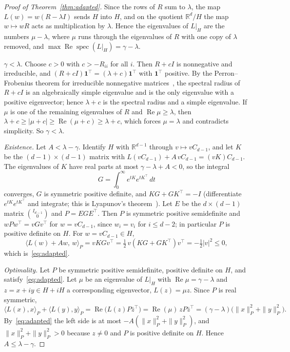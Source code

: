 \documentclass[11pt]{amsart}
\theoremstyle{definition}
\theoremstyle{remark}
\newcommand{\R}{\mathbb R}
\newcommand{\one}{\mathbf 1}
\DeclareMathOperator{\Real}{Re}
\begin{document}
\begin{proof}[Proof of Theorem~\ref{thm:adapted}]
Since the rows of $R$ sum to $\lambda$, the map $L(w)=w(R-\lambda I)$ sends $H$ into $H$, and on the quotient $\R^d/H$ the map $w\mapsto wR$ acts as multiplication by $\lambda$. Hence the eigenvalues of $L|_H$ are the numbers $\mu-\lambda$, where $\mu$ runs through the eigenvalues of $R$ with one copy of $\lambda$ removed, and $\max\Real\operatorname{spec}(L|_H)=\gamma-\lambda$.

\emph{$\gamma<\lambda$.} Choose $c>0$ with $c>-R_{ii}$ for all $i$. Then $R+cI$ is nonnegative and irreducible, and $(R+cI)\one^{\top}=(\lambda+c)\one^{\top}$ with $\one^{\top}$ positive. By the Perron--Frobenius theorem for irreducible nonnegative matrices~\cite[Section~8.4]{HJ}, the spectral radius of $R+cI$ is an algebraically simple eigenvalue and is the only eigenvalue with a positive eigenvector; hence $\lambda+c$ is the spectral radius and a simple eigenvalue. If $\mu$ is one of the remaining eigenvalues of $R$ and $\Real\mu\ge\lambda$, then $\lambda+c\ge|\mu+c|\ge\Real(\mu+c)\ge\lambda+c$, which forces $\mu=\lambda$ and contradicts simplicity. So $\gamma<\lambda$.

\emph{Existence.} Let $A<\lambda-\gamma$. Identify $H$ with $\R^{d-1}$ through $v\mapsto vC_{d-1}$, and let $K$ be the $(d-1)\times(d-1)$ matrix with $L(vC_{d-1})+A\,vC_{d-1}=(vK)C_{d-1}$. The eigenvalues of $K$ have real parts at most $\gamma-\lambda+A<0$, so the integral
\[
G=\int_0^\infty e^{tK}e^{tK^{\top}}\,dt
\]
converges, $G$ is symmetric positive definite, and $KG+GK^{\top}=-I$ (differentiate $e^{tK}e^{tK^{\top}}$ and integrate; this is Lyapunov's theorem~\cite[Section~2.2]{HJTopics}). Let $E$ be the $d\times(d-1)$ matrix $\binom{I_{d-1}}{0}$ and $P=EGE^{\top}$. Then $P$ is symmetric positive semidefinite and $wPw^{\top}=vGv^{\top}$ for $w=vC_{d-1}$, since $w_i=v_i$ for $i\le d-2$; in particular $P$ is positive definite on $H$. For $w=vC_{d-1}\in H$,
\[
\langle L(w)+Aw,\,w\rangle_P=vKGv^{\top}=\tfrac12\,v(KG+GK^{\top})v^{\top}=-\tfrac12|v|^2\le 0,
\]
which is~\eqref{eq:adapted}.

\emph{Optimality.} Let $P$ be symmetric positive semidefinite, positive definite on $H$, and satisfy~\eqref{eq:adapted}. Let $\mu$ be an eigenvalue of $L|_H$ with $\Real\mu=\gamma-\lambda$ and $z=x+iy\in H+iH$ a corresponding eigenvector, $L(z)=\mu z$. Since $P$ is real symmetric,
\[
\langle L(x),x\rangle_P+\langle L(y),y\rangle_P=\Real\big(L(z)P\bar z^{\top}\big)=\Real(\mu)\,zP\bar z^{\top}=(\gamma-\lambda)\big(\|x\|_P^2+\|y\|_P^2\big).
\]
By~\eqref{eq:adapted} the left side is at most $-A(\|x\|_P^2+\|y\|_P^2)$, and $\|x\|_P^2+\|y\|_P^2>0$ because $z\ne0$ and $P$ is positive definite on $H$. Hence $A\le\lambda-\gamma$.
\end{proof}
\end{document}
